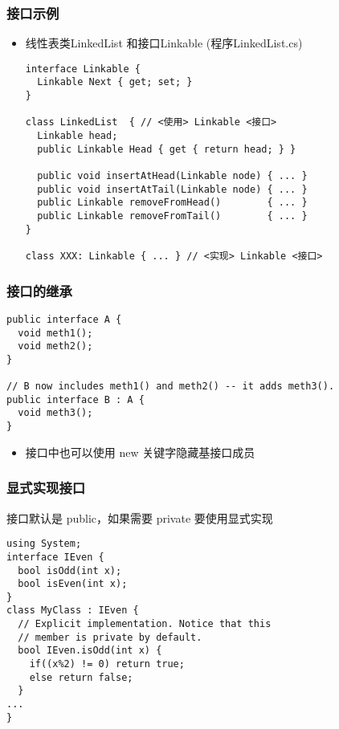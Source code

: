 \begin{frame}[fragile]
\frametitle{接口示例}

\begin{itemize}
\item 线性表类LinkedList 和接口Linkable (程序LinkedList.cs)

\begin{lstlisting}[escapeinside=<>]
interface Linkable {
  Linkable Next { get; set; }  
}

class LinkedList  { // <使用> Linkable <接口>
  Linkable head;
  public Linkable Head { get { return head; } }

  public void insertAtHead(Linkable node) { ... }
  public void insertAtTail(Linkable node) { ... }
  public Linkable removeFromHead()        { ... }
  public Linkable removeFromTail()        { ... }
}

class XXX: Linkable { ... } // <实现> Linkable <接口>
\end{lstlisting}
\end{itemize}

\end{frame}

\begin{frame}[fragile]
\frametitle{接口的继承}
\begin{lstlisting}
public interface A {
  void meth1();
  void meth2();
}

// B now includes meth1() and meth2() -- it adds meth3().
public interface B : A {
  void meth3();
}

\end{lstlisting}
\begin{itemize}
\item 接口中也可以使用 new 关键字隐藏基接口成员
\end{itemize}
\end{frame}

\begin{frame}[fragile]
\frametitle{显式实现接口}
 接口默认是 public，如果需要 private 要使用显式实现
\begin{lstlisting}
using System;
interface IEven {
  bool isOdd(int x);
  bool isEven(int x);
}
class MyClass : IEven {
  // Explicit implementation. Notice that this
  // member is private by default.
  bool IEven.isOdd(int x) {
    if((x%2) != 0) return true;
    else return false;
  }
...
}
\end{lstlisting}

\end{frame}


